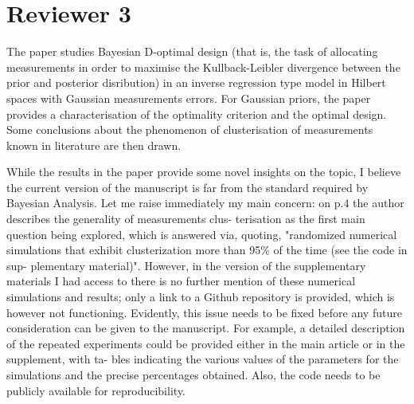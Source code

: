 \documentclass{amsart}
\begin{document}
\section{Reviewer 3}
The paper studies Bayesian D-optimal design (that is, the task of
allocating measurements in order to maximise the Kullback-Leibler
divergence between the prior and posterior disribution) in an inverse
regression type model in Hilbert spaces with Gaussian measurements
errors. For Gaussian priors, the paper provides a characterisation of
the optimality criterion and the optimal design. Some conclusions
about the phenomenon of clusterisation of measurements known in
literature are then drawn.

While the results in the paper provide some novel insights on the
topic, I believe the current version of the manuscript is far from the
standard required by Bayesian Analysis. Let me raise immediately my
main concern: on p.4 the author describes the generality of
measurements clus- terisation as the first main question being
explored, which is answered via, quoting, "randomized numerical
simulations that exhibit clusterization more than 95\% of the time
(see the code in sup- plementary material)". However, in the version
of the supplementary materials I had access to there is no further
mention of these numerical simulations and results; only a link to a
Github repository is provided, which is however not
functioning. Evidently, this issue needs to be fixed before any future
consideration can be given to the manuscript. For example, a detailed
description of the repeated experiments could be provided either in
the main article or in the supplement, with ta- bles indicating the
various values of the parameters for the simulations and the precise
percentages obtained. Also, the code needs to be publicly available
for reproducibility.
\end{document}
